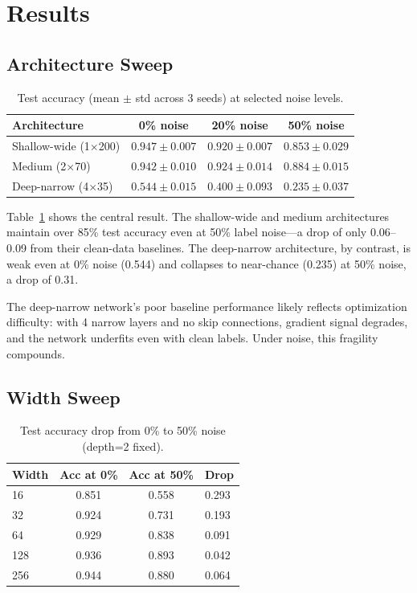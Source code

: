 \documentclass[11pt,a4paper]{article}
\begin{document}
\section{Results}

\subsection{Architecture Sweep}

\begin{table}[h]
\centering
\caption{Test accuracy (mean $\pm$ std across 3 seeds) at selected noise levels.}
\label{tab:arch}
\begin{tabular}{lccc}
\toprule
Architecture & 0\% noise & 20\% noise & 50\% noise \\
\midrule
Shallow-wide (1$\times$200) & $0.947 \pm 0.007$ & $0.920 \pm 0.007$ & $0.853 \pm 0.029$ \\
Medium (2$\times$70)        & $0.942 \pm 0.010$ & $0.924 \pm 0.014$ & $0.884 \pm 0.015$ \\
Deep-narrow (4$\times$35)   & $0.544 \pm 0.015$ & $0.400 \pm 0.093$ & $0.235 \pm 0.037$ \\
\bottomrule
\end{tabular}
\end{table}

Table~\ref{tab:arch} shows the central result.
The shallow-wide and medium architectures maintain over 85\% test accuracy even at 50\% label noise—a drop of only 0.06--0.09 from their clean-data baselines.
The deep-narrow architecture, by contrast, is weak even at 0\% noise (0.544) and collapses to near-chance (0.235) at 50\% noise, a drop of 0.31.

The deep-narrow network's poor baseline performance likely reflects optimization difficulty: with 4 narrow layers and no skip connections, gradient signal degrades, and the network underfits even with clean labels.
Under noise, this fragility compounds.

\subsection{Width Sweep}

\begin{table}[h]
\centering
\caption{Test accuracy drop from 0\% to 50\% noise (depth=2 fixed).}
\label{tab:width}
\begin{tabular}{lccl}
\toprule
Width & Acc at 0\% & Acc at 50\% & Drop \\
\midrule
16  & 0.851 & 0.558 & 0.293 \\
32  & 0.924 & 0.731 & 0.193 \\
64  & 0.929 & 0.838 & 0.091 \\
128 & 0.936 & 0.893 & 0.042 \\
256 & 0.944 & 0.880 & 0.064 \\
\bottomrule
\end{tabular}
\end{table}
\end{document}
